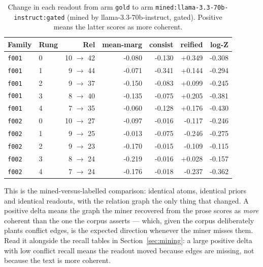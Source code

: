 \documentclass[11pt]{article}
\begin{document}
\begin{table}[htbp]
\centering
\small
\caption{Change in each readout from arm \texttt{gold} to arm \texttt{mined:llama-3.3-70b-instruct:gated} (mined by llama-3.3-70b-instruct, gated). Positive means the latter scores as more coherent.}
\label{tab:arm-delta-gold-mined-llama-3-3-70b-instruct-gated}
\begin{tabular}{llrrrrr}
\toprule
Family & Rung & Rel & \textbf{mean-marg} & \textbf{consist} & \textbf{reified} & \textbf{log-Z} \\
\midrule
\texttt{f001} & 0 & 10 $\to$ 42 & -0.080 & -0.130 & +0.349 & -0.308 \\
\texttt{f001} & 1 & 9 $\to$ 44 & -0.071 & -0.341 & +0.144 & -0.294 \\
\texttt{f001} & 2 & 9 $\to$ 37 & -0.150 & -0.083 & +0.099 & -0.245 \\
\texttt{f001} & 3 & 8 $\to$ 40 & -0.135 & -0.075 & +0.205 & -0.381 \\
\texttt{f001} & 4 & 7 $\to$ 35 & -0.060 & -0.128 & +0.176 & -0.430 \\
\texttt{f002} & 0 & 10 $\to$ 27 & -0.097 & -0.016 & -0.117 & -0.246 \\
\texttt{f002} & 1 & 9 $\to$ 25 & -0.013 & -0.075 & -0.246 & -0.275 \\
\texttt{f002} & 2 & 9 $\to$ 23 & -0.170 & -0.015 & -0.109 & -0.115 \\
\texttt{f002} & 3 & 8 $\to$ 24 & -0.219 & -0.016 & +0.028 & -0.157 \\
\texttt{f002} & 4 & 7 $\to$ 24 & -0.176 & -0.018 & -0.237 & -0.362 \\
\bottomrule
\end{tabular}
\end{table}

This is the mined-versus-labelled comparison: identical atoms, identical priors and identical readouts, with the relation graph the only thing that changed. A positive delta means the graph the miner recovered from the prose scores as \emph{more} coherent than the one the corpus asserts --- which, given the corpus deliberately plants conflict edges, is the expected direction whenever the miner misses them. Read it alongside the recall tables in Section~\ref{sec:mining}: a large positive delta with low conflict recall means the readout moved because edges are missing, not because the text is more coherent.
\end{document}
